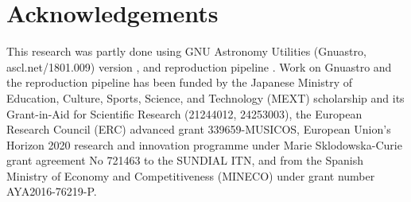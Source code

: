 \documentclass[10pt, twocolumn]{article}
\begin{document}
\section{Acknowledgements}

This research was partly done using GNU Astronomy Utilities (Gnuastro,
ascl.net/1801.009) version \gnuastroversion, and reproduction pipeline
\pipelineversion. Work on Gnuastro and the reproduction pipeline has been
funded by the Japanese Ministry of Education, Culture, Sports, Science, and
Technology (MEXT) scholarship and its Grant-in-Aid for Scientific Research
(21244012, 24253003), the European Research Council (ERC) advanced grant
339659-MUSICOS, European Union’s Horizon 2020 research and innovation
programme under Marie Sklodowska-Curie grant agreement No 721463 to the
SUNDIAL ITN, and from the Spanish Ministry of Economy and Competitiveness
(MINECO) under grant number AYA2016-76219-P.
\end{document}
